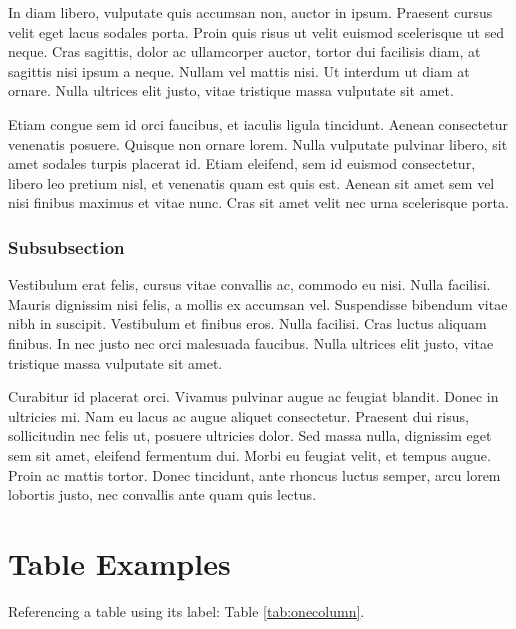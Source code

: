 \documentclass{mathcryptology} %
\begin{document}
In diam libero, vulputate quis accumsan non, auctor in ipsum. Praesent cursus velit eget lacus sodales porta. Proin quis risus ut velit euismod scelerisque ut sed neque. Cras sagittis, dolor ac ullamcorper auctor, tortor dui facilisis diam, at sagittis nisi ipsum a neque. Nullam vel mattis nisi. Ut interdum ut diam at ornare. Nulla ultrices elit justo, vitae tristique massa vulputate sit amet.

Etiam congue sem id orci faucibus, et iaculis ligula tincidunt. Aenean consectetur venenatis posuere. Quisque non ornare lorem. Nulla vulputate pulvinar libero, sit amet sodales turpis placerat id. Etiam eleifend, sem id euismod consectetur, libero leo pretium nisl, et venenatis quam est quis est. Aenean sit amet sem vel nisi finibus maximus et vitae nunc. Cras sit amet velit nec urna scelerisque porta.

\subsubsection{Subsubsection}

Vestibulum erat felis, cursus vitae convallis ac, commodo eu nisi. Nulla facilisi. Mauris dignissim nisi felis, a mollis ex accumsan vel. Suspendisse bibendum vitae nibh in suscipit. Vestibulum et finibus eros. Nulla facilisi. Cras luctus aliquam finibus. In nec justo nec orci malesuada faucibus. Nulla ultrices elit justo, vitae tristique massa vulputate sit amet.

Curabitur id placerat orci. Vivamus pulvinar augue ac feugiat blandit. Donec in ultricies mi. Nam eu lacus ac augue aliquet consectetur. Praesent dui risus, sollicitudin nec felis ut, posuere ultricies dolor. Sed massa nulla, dignissim eget sem sit amet, eleifend fermentum dui. Morbi eu feugiat velit, et tempus augue. Proin ac mattis tortor. Donec tincidunt, ante rhoncus luctus semper, arcu lorem lobortis justo, nec convallis ante quam quis lectus.


\section{Table Examples}

Referencing a table using its label: Table \ref{tab:onecolumn}.
\end{document}
